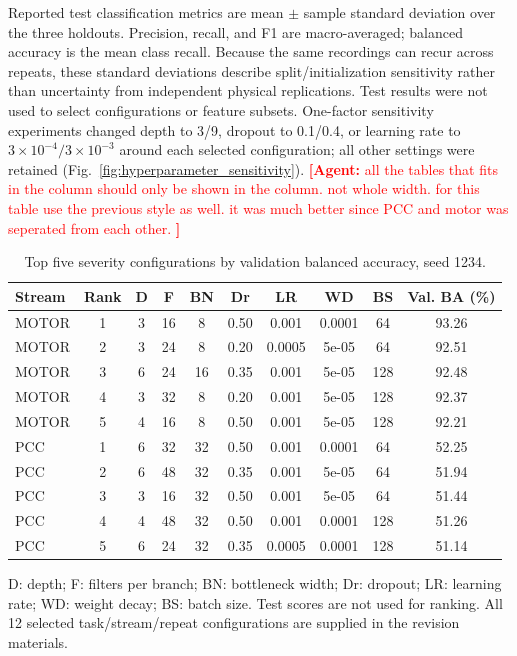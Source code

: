 \documentclass[letterpaper,journal]{IEEEtran}
\newcommand{\agent}[1]{%
    \textcolor{red}{\textbf{[Agent:} #1\textbf{]}}%
}
\begin{document}
Reported test classification metrics are mean $\pm$ sample standard deviation over the three holdouts. Precision, recall, and F1 are macro-averaged; balanced accuracy is the mean class recall. Because the same recordings can recur across repeats, these standard deviations describe split/initialization sensitivity rather than uncertainty from independent physical replications. Test results were not used to select configurations or feature subsets. One-factor sensitivity experiments changed depth to 3/9, dropout to 0.1/0.4, or learning rate to $3\times10^{-4}/3\times10^{-3}$ around each selected configuration; all other settings were retained (Fig.~\ref{fig:hyperparameter_sensitivity}).
\agent{all the tables that fits in the column should only be shown in the column. not whole width. for this table use the previous style as well. it was much better since PCC and motor was seperated from each other. }
\begin{table}[t]
\centering
\footnotesize
\caption{Top five severity configurations by validation balanced accuracy, seed 1234.}
\label{tab:search_top5_combined}
\renewcommand{\arraystretch}{1.12}
\setlength{\tabcolsep}{3pt}
\begin{tabular}{lccccccccc}
\hline
Stream & Rank & D & F & BN & Dr & LR & WD & BS & Val. BA (\%) \\
\hline
MOTOR & 1 & 3 & 16 & 8 & 0.50 & 0.001 & 0.0001 & 64 & 93.26 \\
MOTOR & 2 & 3 & 24 & 8 & 0.20 & 0.0005 & 5e-05 & 64 & 92.51 \\
MOTOR & 3 & 6 & 24 & 16 & 0.35 & 0.001 & 5e-05 & 128 & 92.48 \\
MOTOR & 4 & 3 & 32 & 8 & 0.20 & 0.001 & 5e-05 & 128 & 92.37 \\
MOTOR & 5 & 4 & 16 & 8 & 0.50 & 0.001 & 5e-05 & 128 & 92.21 \\
PCC & 1 & 6 & 32 & 32 & 0.50 & 0.001 & 0.0001 & 64 & 52.25 \\
PCC & 2 & 6 & 48 & 32 & 0.35 & 0.001 & 5e-05 & 64 & 51.94 \\
PCC & 3 & 3 & 16 & 32 & 0.50 & 0.001 & 5e-05 & 64 & 51.44 \\
PCC & 4 & 4 & 48 & 32 & 0.50 & 0.001 & 0.0001 & 128 & 51.26 \\
PCC & 5 & 6 & 24 & 32 & 0.35 & 0.0005 & 0.0001 & 128 & 51.14 \\
\hline
\end{tabular}
\par\smallskip\begin{minipage}{\linewidth}\footnotesize D: depth; F: filters per branch; BN: bottleneck width; Dr: dropout; LR: learning rate; WD: weight decay; BS: batch size. Test scores are not used for ranking. All 12 selected task/stream/repeat configurations are supplied in the revision materials.\end{minipage}
\end{table}
\end{document}
